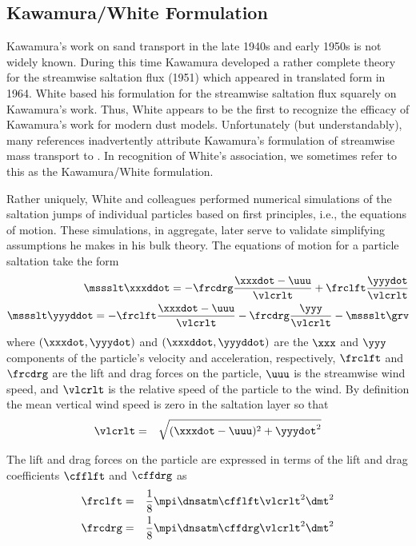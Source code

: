 \documentclass[12pt,twoside]{book}
\begin{document}
\subsection[Kawamura/White Formulation]{Kawamura/White Formulation}\label{sxn:hrz_Whi79}
Kawamura's work on sand transport in the late 1940s and early 1950s
is not widely known.
During this time Kawamura developed a rather complete theory for the
streamwise saltation flux (1951) which appeared in translated form
in 1964.
White based his formulation for the streamwise saltation flux
\cite[]{WGI76,Whi79} squarely on Kawamura's work.  
Thus, White appears to be the first to recognize the efficacy of
Kawamura's work for modern dust models. 
Unfortunately (but understandably), many references inadvertently
attribute Kawamura's formulation of streamwise mass transport to
\cite{Whi79}.
In recognition of White's association, we sometimes refer to this
as the Kawamura/White formulation. 

Rather uniquely, White and colleagues performed numerical simulations
of the saltation jumps of individual particles based on first
principles, i.e., the equations of motion.   
These simulations, in aggregate, later serve to validate simplifying
assumptions he makes in his bulk theory.
The equations of motion for a particle saltation take the form
\begin{eqnarray}
\mssslt \xxxddot = - \frcdrg \frac{\xxxdot - \uuu}{\vlcrlt } 
+ \frclft \frac{\yyydot}{\vlcrlt } \\
\mssslt \yyyddot = - \frclft \frac{\xxxdot - \uuu}{\vlcrlt }  
- \frcdrg \frac{\yyy}{\vlcrlt } - \mssslt \grv 
\end{eqnarray}
where $(\xxxdot,\yyydot)$ and $(\xxxddot,\yyyddot)$ are the $\xxx$ and
$\yyy$ components of the particle's velocity and acceleration,
respectively, $\frclft$ and $\frcdrg$ are the lift and drag forces on
the particle, $\uuu$ is the streamwise wind speed, and $\vlcrlt$ is the
relative speed of the particle to the wind.
By definition the mean vertical wind speed is zero in the saltation
layer so that 
\begin{eqnarray}
\vlcrlt & = & \sqrt{ ( \xxxdot - \uuu )^{2} + \yyydot^{2} }
\end{eqnarray}

The lift and drag forces on the particle are expressed in terms of the
lift and drag coefficients $\cfflft$ and $\cffdrg$ as
\begin{eqnarray}
\frclft & = & \frac{1}{8} \mpi \dnsatm \cfflft \vlcrlt^{2} \dmt^{2} \\
\frcdrg & = & \frac{1}{8} \mpi \dnsatm \cffdrg \vlcrlt^{2} \dmt^{2}
\end{eqnarray}
\end{document}
